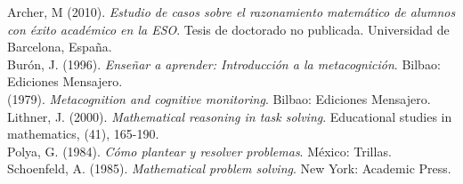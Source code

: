 \begin{titlepage}
\begin{minipage}{0.85\linewidth}
\end{minipage}
\vspace{5pt}
\begin{thebibliography}{99}

 {\sc Archer, M } (2010). {\it Estudio de casos sobre el razonamiento matem\'{a}tico de alumnos con \'{e}xito acad\'{e}mico en la ESO}. Tesis de doctorado no publicada. Universidad de Barcelona, Espa\~{n}a.\\

 {\sc	Bur\'{o}n, J. } (1996). {\it Ense\~{n}ar a aprender: Introducci\'{o}n a la metacognici\'{o}n}.  Bilbao: Ediciones Mensajero.\\

 (1979). {\it Metacognition and cognitive monitoring}.  Bilbao: Ediciones Mensajero.\\

 {\sc	Lithner, J. } (2000). {\it Mathematical reasoning in task solving}. Educational studies in mathematics, (41), 165-190.\\

 {\sc	Polya, G. } (1984). {\it C\'{o}mo plantear y resolver problemas}. M\'{e}xico: Trillas.\\

 {\sc	Schoenfeld, A. } (1985). {\it Mathematical problem solving}. New York: Academic Press.\\

\end{thebibliography}
\end{titlepage}
\author{%
\vspace{2pt}\\
    John Jairo Garc\'{i}a Mora,\vspace{2pt} \\
   Instituto tecn\'ologico Metropolitano,\vspace{2pt} \\
    \hspace*{-2cm}\texttt{\scriptsize jhongarcia@itm.edu.co}\vspace{20pt} \\
         }
\pagecolor{white}
\pagestyle{eimat}

